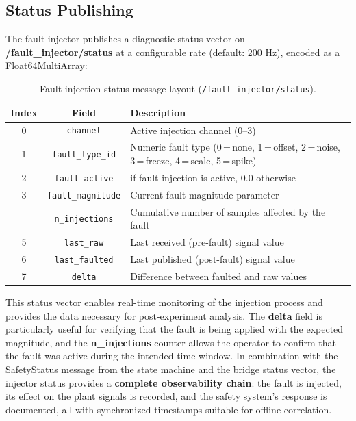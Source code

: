 \subsection{Status Publishing}
The fault injector publishes a diagnostic status vector on \textbf{/fault\_injector/status} at a configurable rate (default: 200 Hz), encoded as a Float64MultiArray:

\begin{table}[htbp]
\centering
\small
\caption{Fault injection status message layout (\texttt{/fault\_injector/status}).}
\label{tab:fault_injection_status}
\begin{tabularx}{\textwidth}{cc>{\raggedright\arraybackslash}X}
\toprule
\textbf{Index} & \textbf{Field} & \textbf{Description} \\
\midrule
0 & \texttt{channel}          & Active injection channel (0--3) \\
1 & \texttt{fault\_type\_id}  & Numeric fault type (0\,=\,none, 1\,=\,offset, 2\,=\,noise, 3\,=\,freeze, 4\,=\,scale, 5\,=\,spike) \\
2 & \texttt{fault\_active}    & 1.0 if fault injection is active, 0.0 otherwise \\
3 & \texttt{fault\_magnitude} & Current fault magnitude parameter \\
\addlinespace
4 & \texttt{n\_injections}    & Cumulative number of samples affected by the fault \\
5 & \texttt{last\_raw}        & Last received (pre-fault) signal value \\
6 & \texttt{last\_faulted}    & Last published (post-fault) signal value \\
7 & \texttt{delta}            & Difference between faulted and raw values \\
\bottomrule
\end{tabularx}
\end{table}

This status vector enables real-time monitoring of the injection process and provides the data necessary for post-experiment analysis. The \textbf{delta} field is particularly useful for verifying that the fault is being applied with the expected magnitude, and the \textbf{n\_injections} counter allows the operator to confirm that the fault was active during the intended time window. In combination with the SafetyStatus message from the state machine and the bridge status vector, the injector status provides a \textbf{complete observability chain}: the fault is injected, its effect on the plant signals is recorded, and the safety system's response is documented, all with synchronized timestamps suitable for offline correlation.


